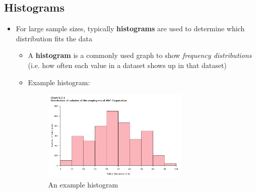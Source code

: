 \documentclass[12pt]{article}
\begin{document}
\subsection{Histograms}
\begin{itemize}
	\item For large sample sizes, typically \textbf{histograms} are used to
	      determine which distribution fits the data
	      \begin{itemize}
		      \item A \textbf{histogram} is a commonly used graph to show
		            \emph{frequency distributions} (i.e. how often each value in
		            a dataset shows up in that dataset)
		      \item Example histogram:
		            \begin{figure}[H]
			            \begin{center}
				            \includegraphics[width=0.7\textwidth]{1}
			            \end{center}
			            \caption{An example histogram}\label{fig:1}
		            \end{figure}
	      \end{itemize}
\end{itemize}
\end{document}
